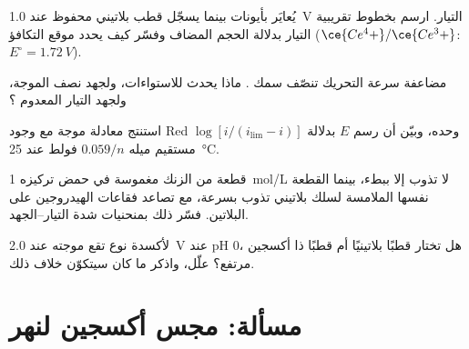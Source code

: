 \begin{exercise}[$\star\star$]\label{exo:b2:current-potential-curves:8}
يُعايَر  بأيونات  بينما يسجّل قطب بلاتيني محفوظ عند
\qty{1.0}{V} التيار. ارسم بخطوط تقريبية التيار بدلالة الحجم المضاف
وفسّر كيف يحدد موقع التكافؤ ($\ce{Ce^4+}/\ce{Ce^3+}$: $E^\circ =
\qty{1.72}{V}$).
\end{exercise}

\begin{exercise}[$\star\star$]\label{exo:b2:current-potential-curves:9}
مضاعفة سرعة التحريك تنصّف سمك . ماذا
يحدث للاستواءات، ولجهد نصف الموجة، ولجهد التيار
المعدوم ؟
\end{exercise}

\begin{exercise}[$\star\star\star$]\label{exo:b2:current-potential-curves:10}
استنتج معادلة موجة  مع وجود Red وحده، 
وبيّن أن رسم $E$ بدلالة $\log[i/(i_{\lim} - i)]$ مستقيم
ميله $0.059/n$ فولط عند \qty{25}{\degreeCelsius}.
\end{exercise}

\begin{exercise}[$\star\star\star$]\label{exo:b2:current-potential-curves:11}
قطعة من الزنك مغموسة في حمض تركيزه \qty{1}{mol/L} لا تذوب إلا ببطء، بينما
القطعة نفسها الملامسة لسلك بلاتيني تذوب بسرعة، مع تصاعد فقاعات الهيدروجين
على البلاتين. فسّر ذلك بمنحنيات شدة التيار--الجهد.
\end{exercise}

\begin{exercise}[$\star\star\star$]\label{exo:b2:current-potential-curves:12}
لأكسدة نوع تقع موجته عند \qty{2.0}{V} عند pH 0، هل تختار
قطبًا بلاتينيًا أم قطبًا ذا  أكسجين مرتفع؟ علّل، واذكر
ما كان سيتكوّن خلاف ذلك.
\end{exercise}

\section{مسألة: مجس أكسجين لنهر}

